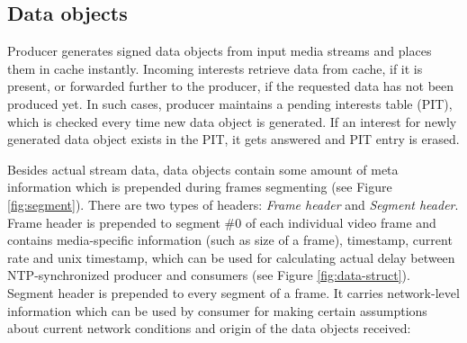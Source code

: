 \documentclass[10pt]{proc}
\begin{document}
\subsection{Data objects}
Producer generates signed data objects from input media streams and places them in cache instantly. Incoming interests retrieve data from cache, if it is present, or forwarded further to the producer, if the requested data has not been produced yet. In such cases, producer maintains a pending interests table (PIT), which is checked every time new data object is generated. If an interest for newly generated data object exists in the PIT, it gets answered and PIT entry is erased.

Besides actual stream data, data objects contain some amount of meta information which is prepended during frames segmenting (see Figure \ref{fig:segment}). There are two types of headers: \textit{Frame header} and \textit{Segment header}. Frame header is prepended to segment \#0 of each individual video frame and contains media-specific information (such as size of a frame), timestamp, current rate and unix timestamp, which can be used for calculating actual delay between NTP-synchronized producer and consumers (see Figure \ref{fig:data-struct}). Segment header is prepended to every segment of a frame. It carries network-level information which can be used by consumer for making certain assumptions about current network conditions and origin of the data objects received:
\end{document}
